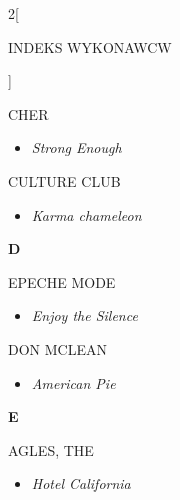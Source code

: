 \documentclass[a4paper]{report}
\begin{document}
\begin{multicols*}{2}[\begin{Huge}INDEKS WYKONAWCW\end{Huge}\vspace{1cm}]
\begin{minipage}{\columnwidth}
\begin{itemize}[topsep=3pt, after=\vspace{3mm}]
	\end{itemize}
\end{minipage}
\begin{minipage}{\columnwidth}
	CHER 
	\begin{itemize}[topsep=3pt, after=\vspace{3mm}]
		\itemsep0em
		\item[]\textit{Strong Enough}  \\
	\end{itemize}
\end{minipage}
\begin{minipage}{\columnwidth}
	CULTURE CLUB 
	\begin{itemize}[topsep=3pt, after=\vspace{3mm}]
		\itemsep0em
		\item[]\textit{Karma chameleon}  \\
	\end{itemize}
\end{minipage}
\begin{minipage}{\columnwidth}
	\begin{Large}\textbf{D}\end{Large}EPECHE MODE 
	\begin{itemize}[topsep=3pt, after=\vspace{3mm}]
		\itemsep0em
		\item[]\textit{Enjoy the Silence}  \\
	\end{itemize}
\end{minipage}
\begin{minipage}{\columnwidth}
	DON MCLEAN 
	\begin{itemize}[topsep=3pt, after=\vspace{3mm}]
		\itemsep0em
		\item[]\textit{American Pie}  \\
	\end{itemize}
\end{minipage}
\begin{minipage}{\columnwidth}
	\begin{Large}\textbf{E}\end{Large}AGLES, THE 
	\begin{itemize}[topsep=3pt, after=\vspace{3mm}]
		\itemsep0em
		\item[]\textit{Hotel California}  \\
	\end{itemize}

\end{minipage}
\end{multicols*}
\end{document}
